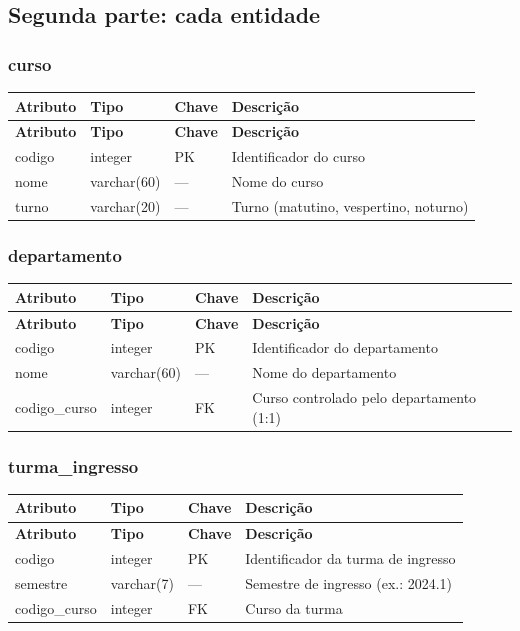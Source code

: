 \documentclass[12pt,a4paper]{article}
\begin{document}
\subsection{Segunda parte: cada entidade}

\subsubsection{curso}

\begin{longtable}{@{}llll@{}}
\toprule
\textbf{Atributo} & \textbf{Tipo} & \textbf{Chave} & \textbf{Descrição} \\
\midrule
\endfirsthead
\toprule
\textbf{Atributo} & \textbf{Tipo} & \textbf{Chave} & \textbf{Descrição} \\
\midrule
\endhead
codigo & integer & PK & Identificador do curso \\
nome & varchar(60) & --- & Nome do curso \\
turno & varchar(20) & --- & Turno (matutino, vespertino, noturno) \\
\bottomrule
\end{longtable}

\subsubsection{departamento}

\begin{longtable}{@{}llll@{}}
\toprule
\textbf{Atributo} & \textbf{Tipo} & \textbf{Chave} & \textbf{Descrição} \\
\midrule
\endfirsthead
\toprule
\textbf{Atributo} & \textbf{Tipo} & \textbf{Chave} & \textbf{Descrição} \\
\midrule
\endhead
codigo & integer & PK & Identificador do departamento \\
nome & varchar(60) & --- & Nome do departamento \\
codigo\_curso & integer & FK & Curso controlado pelo departamento (1:1) \\
\bottomrule
\end{longtable}

\subsubsection{turma\_ingresso}

\begin{longtable}{@{}llll@{}}
\toprule
\textbf{Atributo} & \textbf{Tipo} & \textbf{Chave} & \textbf{Descrição} \\
\midrule
\endfirsthead
\toprule
\textbf{Atributo} & \textbf{Tipo} & \textbf{Chave} & \textbf{Descrição} \\
\midrule
\endhead
codigo & integer & PK & Identificador da turma de ingresso \\
semestre & varchar(7) & --- & Semestre de ingresso (ex.: 2024.1) \\
codigo\_curso & integer & FK & Curso da turma \\
\bottomrule
\end{longtable}
\end{document}
